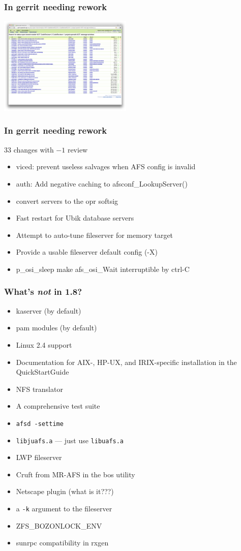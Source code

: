 \documentclass{beamer}
\begin{document}
\begin{frame}
\frametitle{In gerrit needing rework}
\includegraphics[width=2.5in]{gerrit-minusone}
\end{frame}

\begin{frame}
\frametitle{In gerrit needing rework}
33 changes with $-1$ review
\begin{itemize}
\item{viced: prevent useless salvages when AFS config is invalid}
\item{auth: Add negative caching to afsconf\_LookupServer()}
\item{convert servers to the opr softsig}
\item{Fast restart for Ubik database servers}
\pause
\item{Attempt to auto-tune fileserver for memory target}
\item{Provide a usable fileserver default config (-X)}
\pause
\item{p\_osi\_sleep make afs\_osi\_Wait interruptible by ctrl-C}
\end{itemize}
\end{frame}

\begin{frame}[fragile]
\frametitle{What's {\em not} in 1.8?}
\begin{itemize}
\item{kaserver (by default)}
\item{pam modules (by default)}
\item{Linux 2.4 support}
\item{Documentation for AIX-, HP-UX, and IRIX-specific installation in the
QuickStartGuide}
\item{NFS translator}
\item{A comprehensive test suite}
\item{\verb+afsd -settime+}
\item{\verb+libjuafs.a+ --- just use \verb+libuafs.a+}
\item{LWP fileserver}
\item{Cruft from MR-AFS in the bos utility}
\item{Netscape plugin (what is it???)}
\item{a \verb+-k+ argument to the fileserver}
\item{ZFS\_BOZONLOCK\_ENV}
\item{sunrpc compatibility in rxgen}
\end{itemize}
\end{frame}
\end{document}
